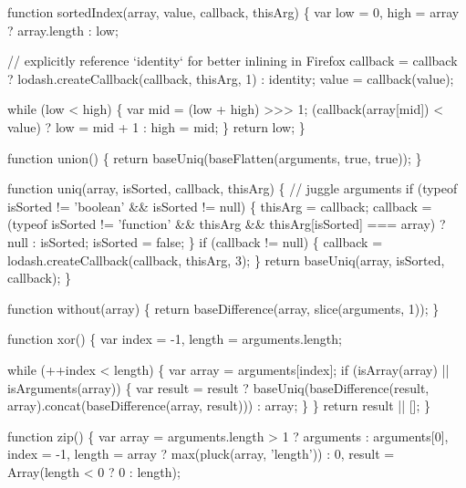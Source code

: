 \begin{DoxyCodeInclude}
    \textcolor{keyword}{function} sortedIndex(array, value, callback, thisArg) \{
      var low = 0,
          high = array ? array.length : low;

      \textcolor{comment}{// explicitly reference `identity` for better inlining in Firefox}
      callback = callback ? lodash.createCallback(callback, thisArg, 1) : identity;
      value = callback(value);

      \textcolor{keywordflow}{while} (low < high) \{
        var mid = (low + high) >>> 1;
        (callback(array[mid]) < value)
          ? low = mid + 1
          : high = mid;
      \}
      \textcolor{keywordflow}{return} low;
    \}

    \textcolor{keyword}{function} \textcolor{keyword}{union}() \{
      \textcolor{keywordflow}{return} baseUniq(baseFlatten(arguments, \textcolor{keyword}{true}, \textcolor{keyword}{true}));
    \}

    \textcolor{keyword}{function} uniq(array, isSorted, callback, thisArg) \{
      \textcolor{comment}{// juggle arguments}
      \textcolor{keywordflow}{if} (typeof isSorted != \textcolor{stringliteral}{'boolean'} && isSorted != null) \{
        thisArg = callback;
        callback = (typeof isSorted != \textcolor{stringliteral}{'function'} && thisArg && thisArg[isSorted] === array) ? null : 
      isSorted;
        isSorted = \textcolor{keyword}{false};
      \}
      \textcolor{keywordflow}{if} (callback != null) \{
        callback = lodash.createCallback(callback, thisArg, 3);
      \}
      \textcolor{keywordflow}{return} baseUniq(array, isSorted, callback);
    \}

    \textcolor{keyword}{function} without(array) \{
      \textcolor{keywordflow}{return} baseDifference(array, slice(arguments, 1));
    \}

    \textcolor{keyword}{function} xor() \{
      var index = -1,
          length = arguments.length;

      \textcolor{keywordflow}{while} (++index < length) \{
        var array = arguments[index];
        \textcolor{keywordflow}{if} (isArray(array) || isArguments(array)) \{
          var result = result
            ? baseUniq(baseDifference(result, array).concat(baseDifference(array, result)))
            : array;
        \}
      \}
      \textcolor{keywordflow}{return} result || [];
    \}

    \textcolor{keyword}{function} zip() \{
      var array = arguments.length > 1 ? arguments : arguments[0],
          index = -1,
          length = array ? max(pluck(array, \textcolor{stringliteral}{'length'})) : 0,
          result = Array(length < 0 ? 0 : length);


\end{DoxyCodeInclude}

